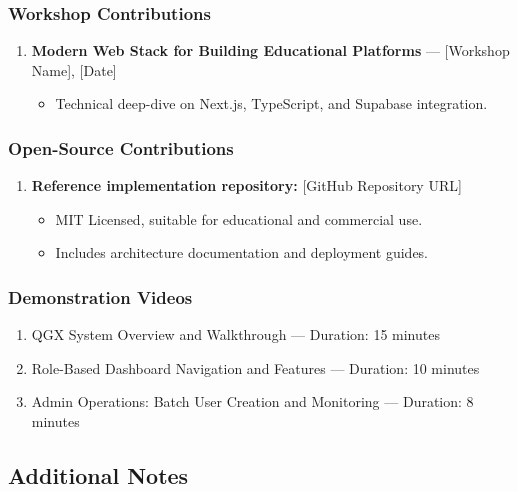 \documentclass[11pt,a4paper]{article}
\begin{document}
\subsubsection{Workshop Contributions}

\begin{enumerate}
    \item \textbf{Modern Web Stack for Building Educational Platforms} --- [Workshop Name], [Date]
    \begin{itemize}
        \item Technical deep-dive on Next.js, TypeScript, and Supabase integration.
    \end{itemize}
\end{enumerate}

\subsubsection{Open-Source Contributions}

\begin{enumerate}
    \item \textbf{Reference implementation repository:} [GitHub Repository URL]
    \begin{itemize}
        \item MIT Licensed, suitable for educational and commercial use.
        \item Includes architecture documentation and deployment guides.
    \end{itemize}
\end{enumerate}

\subsubsection{Demonstration Videos}

\begin{enumerate}
    \item QGX System Overview and Walkthrough --- Duration: 15 minutes
    \item Role-Based Dashboard Navigation and Features --- Duration: 10 minutes
    \item Admin Operations: Batch User Creation and Monitoring --- Duration: 8 minutes
\end{enumerate}

\subsection{Additional Notes}
\end{document}
